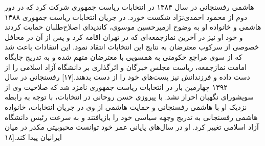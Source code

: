 هاشمی رفسنجانی در سال ۱۳۸۴ در انتخابات ریاست جمهوری شرکت کرد که در دور دوم از محمود احمدی‌نژاد شکست خورد. در جریان انتخابات ریاست جمهوری ۱۳۸۸ هاشمی و خانواده او به وضوح ازمیرحسین موسوی، کاندیدای اصلاح‌طلبان حمایت کردند و خود او نیز در آخرین نمازجمعه‌ای که در تهران اقامه کرد و پس از آن در محافل خصوصی از سرکوب معترضان به نتایج این انتخابات انتقاد نمود. این انتقادات باعث شد که از سوی مراجع حکومتی به همسویی با معترضان متهم شده و به تدریج جایگاه امامت نمازجمعه، ریاست مجلس خبرگان و اثرگذاری بر دانشگاه آزاد اسلامی را از دست داده و فرزندانش نیز پست‌های خود را از دست بدهند.[۱۷]
رفسنجانی در سال ۱۳۹۲ چهارمین بار در انتخابات ریاست جمهوری نامزد شد که صلاحیت وی از سویشورای نگهبان احراز نشد. با پیروزی حسن روحانی در انتخابات، با توجه به رابطه نزدیک او با هاشمی رفسنجانی و حمایت هاشمی از وی در جریان انتخابات، خانواده هاشمی رفسنجانی به تدریج وجهه سیاسی خود را بازیافتند و به سرعت رئیس دانشگاه آزاد اسلامی تغییر کرد. او در سال‌های پایانی عمر خود توانست محبوبیتی مکدر در میان ایرانیان پیدا کند.[۱۸